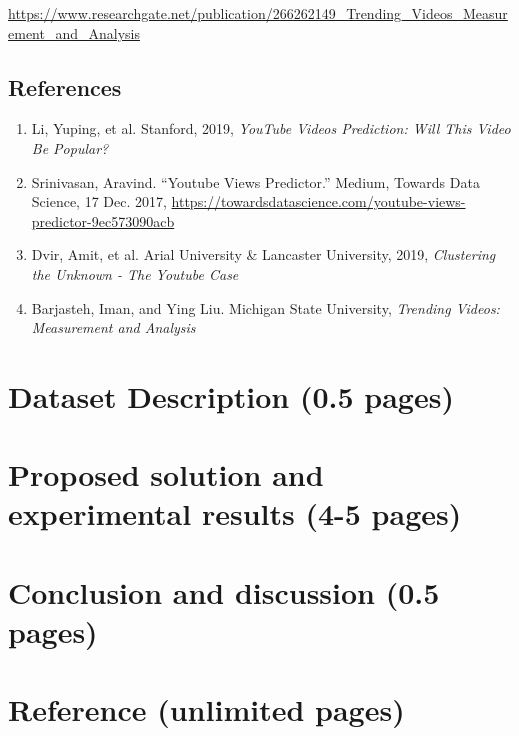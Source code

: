 \documentclass{article}
\begin{document}
\href{https://www.researchgate.net/publication/266262149_Trending_Videos_Measurement_and_Analysis}{https://www.researchgate.net/publication/266262149\_Trending\_Videos\_Measurement\_and\_Analysis} 

\subsection*{References}
\begin{enumerate}
  \item Li, Yuping, et al. Stanford, 2019, \textit{YouTube Videos Prediction: Will This Video Be Popular?} 
  \item Srinivasan, Aravind. “Youtube Views Predictor.” Medium, Towards Data Science, 17 Dec. 2017, \href{https://towardsdatascience.com/youtube-views-predictor-9ec573090acb}{https://towardsdatascience.com/youtube-views-predictor-9ec573090acb}
  \item Dvir, Amit, et al. Arial University & Lancaster University, 2019, \textit{Clustering the Unknown - The Youtube Case}
  \item Barjasteh, Iman, and Ying Liu. Michigan State University, \textit{Trending Videos: Measurement and Analysis}
\end{enumerate}


\section*{Dataset Description (0.5 pages)}
\section*{Proposed solution and experimental results (4-5 pages)}
\section*{Conclusion and discussion (0.5 pages)}
\section*{Reference (unlimited pages)}
\end{document}
